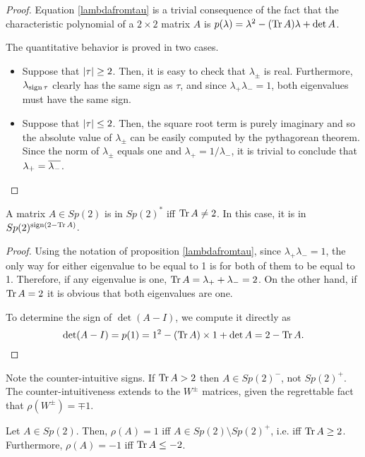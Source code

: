 \begin{proof}
Equation \eqref{lambdafromtau} is a trivial consequence of the fact that the characteristic polynomial of a $2 \times 2$ matrix $A$ is $p(\lambda) = \lambda^2 - (\operatorname{Tr} A) \lambda + \det A$.

The quantitative behavior is proved in two cases.
\begin{itemize}
\item Suppose that $\lvert\tau\rvert \geq 2$. Then, it is easy to check that $\lambda_\pm$ is real. Furthermore, $\lambda_{\operatorname{sign} \tau}$ clearly has the same sign as $\tau$, and since $\lambda_+ \lambda_- = 1$, both eigenvalues must have the same sign.
\item Suppose that $\lvert\tau\rvert \leq 2$. Then, the square root term is purely imaginary and so the absolute value of $\lambda_\pm$ can be easily computed by the pythagorean theorem. Since the norm of $\lambda_\pm$ equals one and $\lambda_+ = 1/\lambda_-$, it is trivial to conclude that $\lambda_+ = \overline{\lambda_-}$.
\end{itemize}
\end{proof}

\begin{corollary}\label{sp2sgn}
A matrix $A \in Sp(2)$ is in $Sp(2)^*$ iff $\operatorname{Tr} A \neq 2$. In this case, it is in $Sp(2)^{\operatorname{sign}(2 - \operatorname{Tr} A)}$.
\end{corollary}

\begin{proof}
Using the notation of proposition \ref{lambdafromtau}, since $\lambda_+ \lambda_- = 1$, the only way for either eigenvalue to be equal to 1 is for both of them to be equal to 1. Therefore, if any eigenvalue is one, $\operatorname{Tr} A = \lambda_+ + \lambda_- = 2$. On the other hand, if $\operatorname{Tr} A = 2$ it is obvious that both eigenvalues are one.

To determine the sign of $\det(A-I)$, we compute it directly as
\begin{equation}
\det(A-I) = p(1) = 1^2 - (\operatorname{Tr} A) \times 1 + \det A = 2 - \operatorname{Tr} A.
\end{equation}
\end{proof}

\begin{remark}
Note the counter-intuitive signs. If $\operatorname{Tr} A > 2$ then $A \in Sp(2)^-$, not $Sp(2)^+$. The counter-intuitiveness extends to the $W^\pm$ matrices, given the regrettable fact that $\rho(W^\pm) = \mp 1$.
\end{remark}

\begin{corollary}\label{sp2pm}
Let $A \in Sp(2)$. Then, $\rho(A) = 1$ iff $A \in Sp(2) \setminus Sp(2)^+$, i.e. iff $\operatorname{Tr} A \geq 2$. Furthermore, $\rho(A) = -1$ iff $\operatorname{Tr} A \leq -2$.
\end{corollary}

